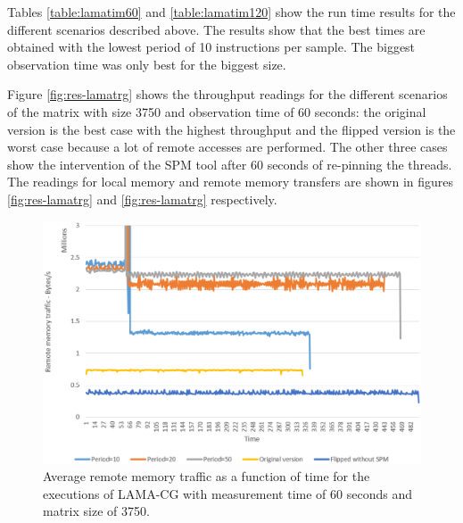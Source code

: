 Tables \ref{table:lamatim60} and \ref{table:lamatim120} show the run time results for the different scenarios described above. The results show that the best times are obtained with the lowest period of 10 instructions per sample. The biggest observation time was only best for the biggest size.

Figure \ref{fig:res-lamatrg} shows the throughput readings for the different scenarios of the matrix with size 3750 and observation time of 60 seconds: the original version is the best case with the highest throughput and the flipped version is the worst case because a lot of remote accesses are performed. The other three cases show the intervention of the SPM tool after 60 seconds of re-pinning the threads. The readings for local memory and remote memory transfers are shown in figures \ref{fig:res-lamatrg} and \ref{fig:res-lamatrg} respectively.

\begin{figure}[th]
	\centering
		\includegraphics[width=.9\textwidth]{figures/lama-remotetr.eps}
		\caption{Average remote memory traffic as a function of time for the executions of LAMA-CG with measurement time of 60 seconds and matrix size of 3750.}
		\label{fig:res-lamaremotr}
\end{figure}